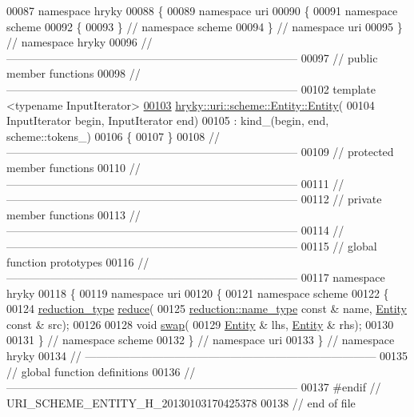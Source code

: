 \begin{DoxyCode}
00087 \textcolor{keyword}{namespace }hryky
00088 \{
00089 \textcolor{keyword}{namespace }uri
00090 \{
00091 \textcolor{keyword}{namespace }scheme
00092 \{
00093 \} \textcolor{comment}{// namespace scheme}
00094 \} \textcolor{comment}{// namespace uri}
00095 \} \textcolor{comment}{// namespace hryky}
00096 \textcolor{comment}{//
      ------------------------------------------------------------------------------}
00097 \textcolor{comment}{// public member functions}
00098 \textcolor{comment}{//
      ------------------------------------------------------------------------------}
00102 \textcolor{comment}{}\textcolor{keyword}{template} <\textcolor{keyword}{typename} InputIterator>
\hypertarget{uri__scheme__entity_8h_source_l00103}{}\hyperlink{classhryky_1_1uri_1_1scheme_1_1_entity_a112fa321ebade92f0f6cff0a598260ea}{00103} \hyperlink{classhryky_1_1uri_1_1scheme_1_1_entity_ada931c924b1cd31c79f9e42ce01108e8}{hryky::uri::scheme::Entity::Entity}(
00104     InputIterator begin, InputIterator end)
00105     : kind\_(begin, end, scheme::tokens\_)
00106 \{
00107 \}
00108 \textcolor{comment}{//
      ------------------------------------------------------------------------------}
00109 \textcolor{comment}{// protected member functions}
00110 \textcolor{comment}{//
      ------------------------------------------------------------------------------}
00111 \textcolor{comment}{//
      ------------------------------------------------------------------------------}
00112 \textcolor{comment}{// private member functions}
00113 \textcolor{comment}{//
      ------------------------------------------------------------------------------}
00114 \textcolor{comment}{//
      ------------------------------------------------------------------------------}
00115 \textcolor{comment}{// global function prototypes}
00116 \textcolor{comment}{//
      ------------------------------------------------------------------------------}
00117 \textcolor{keyword}{namespace }hryky
00118 \{
00119 \textcolor{keyword}{namespace }uri
00120 \{
00121 \textcolor{keyword}{namespace }scheme
00122 \{
00124     \hyperlink{classhryky_1_1_intrusive_ptr}{reduction_type} \hyperlink{namespacehryky_1_1uri_ab4530b241565d82fb0768bb29031858f}{reduce}(
00125         \hyperlink{classhryky_1_1reduction_1_1_string}{reduction::name_type} \textcolor{keyword}{const} & name, \hyperlink{classhryky_1_1uri_1_1scheme_1_1_entity}{Entity} \textcolor{keyword}{const} & src);
00126 
00128     \textcolor{keywordtype}{void} \hyperlink{namespacehryky_1_1uri_a385681623309ce37d502b7efea1bf924}{swap}(
00129         \hyperlink{classhryky_1_1uri_1_1scheme_1_1_entity}{Entity} & lhs, \hyperlink{classhryky_1_1uri_1_1scheme_1_1_entity}{Entity} & rhs);
00130 
00131 \} \textcolor{comment}{// namespace scheme}
00132 \} \textcolor{comment}{// namespace uri}
00133 \} \textcolor{comment}{// namespace hryky}
00134 \textcolor{comment}{//
      ------------------------------------------------------------------------------}
00135 \textcolor{comment}{// global function definitions}
00136 \textcolor{comment}{//
      ------------------------------------------------------------------------------}
00137 \textcolor{preprocessor}{#endif // URI\_SCHEME\_ENTITY\_H\_20130103170425378}
00138 \textcolor{preprocessor}{}\textcolor{comment}{// end of file}
\end{DoxyCode}
